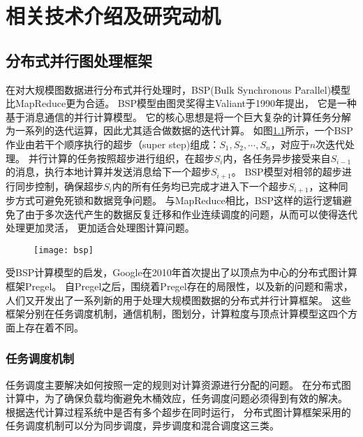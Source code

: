 \chapter{相关技术介绍及研究动机}
\section{分布式并行图处理框架}
在对大规模图数据进行分布式并行处理时，BSP(Bulk Synchronous Parallel)模型\cite{bsp@1990}比MapReduce更为合适。
BSP模型由图灵奖得主Valiant于1990年提出，
它是一种基于消息通信的并行计算模型。
它的核心思想是将一个巨大复杂的计算任务分解为一系列的迭代运算，因此尤其适合做数据的迭代计算。
如图\ref{fig:bsp}所示，一个BSP作业由若干个顺序执行的超步（super step)组成：$S_1,S_2,\cdots,S_n$，对应于$n$次迭代处理。
并行计算的任务按照超步进行组织，在超步$S_i$内，各任务异步接受来自$S_{i-1}$的消息，执行本地计算并发送消息给下一个超步$S_{i+1}$。
BSP模型对相邻的超步进行同步控制，确保超步$S_i$内的所有任务均已完成才进入下一个超步$S_{i+1}$，这种同步方式可避免死锁和数据竞争问题。
与MapReduce相比，BSP这样的运行逻辑避免了由于多次迭代产生的数据反复迁移和作业连续调度的问题，从而可以使得迭代处理更加灵活，
更加适合处理图计算问题。
\begin{figure}[!htbp]
  \centering
  \texttt{[image: bsp]}
  \label{fig:bsp}
\end{figure}

受BSP计算模型的启发，Google在2010年首次提出了以顶点为中心的分布式图计算框架Pregel\cite{Malewicz@SIGMOD10}。
自Pregel之后，围绕着Pregel存在的局限性，以及新的问题和需求，人们又开发出了一系列新的用于处理大规模图数据的分布式并行计算框架。
这些框架分别在任务调度机制，通信机制，图划分，计算粒度与顶点计算模型这四个方面上存在着不同\cite{TLV, reviewruc}。

\subsection{任务调度机制}
任务调度主要解决如何按照一定的规则对计算资源进行分配的问题。
在分布式图计算中，为了确保负载均衡避免木桶效应，任务调度问题必须得到有效的解决。
根据迭代计算过程系统中是否有多个超步在同时运行，
分布式图计算框架采用的任务调度机制可以分为同步调度，异步调度和混合调度这三类。

